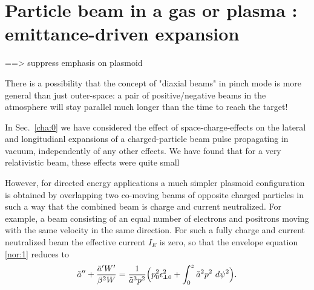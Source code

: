 \documentclass [12pt,a4paper,     ]{report} %
\newcommand{\tr}{\pmb{\perp}}         %
\begin{document}





\section{Particle beam in a gas or plasma : emittance-driven expansion}
\label{ten:0}

==>  suppress emphasis on plasmoid


There is a possibility that the concept of "diaxial beams" in pinch mode is more general than just outer-space:  a pair of positive/negative beams in the atmosphere will stay parallel much longer than the time to reach the target!



In Sec.~\ref{cha:0} we have considered the effect of space-charge-effects on the lateral and longitudianl expansions of a charged-particle beam pulse propagating in vacuum, independently of any other effects.  We have found that for a very relativistic beam, these effects were quite small


   However, for directed energy applications a much simpler plasmoid configuration is obtained by overlapping two co-moving beams of opposite charged particles in such a way that the combined beam is charge and current neutralized.  For example, a beam consisting of an equal number of electrons and positrons moving with the same velocity in the same direction.  For such a fully charge and current neutralized beam the effective current $I_E$ is zero, so that the envelope equation \eqref{nor:1} reduces to
%
\begin{equation}\label{ten:1} %
    \tilde{a}'' + \frac{\tilde{a}'W'}{\beta^2W}
                = \frac{1}{\tilde{a}^3p^2}
   \Bigl(p_0^2\epsilon_{\tr 0}^2  + \int_0^z \tilde{a}^2p^2 ~ d\psi^2\Bigr).
\end{equation}
%
\end{document}
